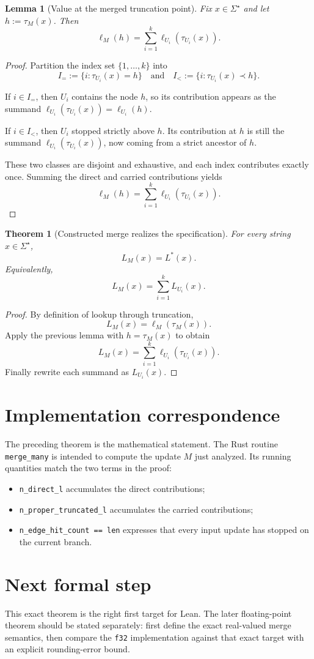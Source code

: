 \documentclass{article}
\newtheorem{lemma}{Lemma}
\newtheorem{theorem}{Theorem}
\begin{document}
\begin{lemma}[Value at the merged truncation point]
Fix $x \in \Sigma^\star$ and let $h := \tau_M(x)$.
Then
\[
\ell_M(h) = \sum_{i=1}^k \ell_{U_i}(\tau_{U_i}(x)).
\]
\end{lemma}

\begin{proof}
Partition the index set $\{1,\dots,k\}$ into
\[
I_{=}:=\{i : \tau_{U_i}(x)=h\}
\quad\text{and}\quad
I_{<}:=\{i : \tau_{U_i}(x)\prec h\}.
\]

If $i \in I_{=}$, then $U_i$ contains the node $h$, so its contribution appears
as the summand $\ell_{U_i}(\tau_{U_i}(x)) = \ell_{U_i}(h)$.

If $i \in I_{<}$, then $U_i$ stopped strictly above $h$.
Its contribution at $h$ is still the summand
$\ell_{U_i}(\tau_{U_i}(x))$, now coming from a strict ancestor of $h$.

These two classes are disjoint and exhaustive, and each index contributes
exactly once.
Summing the direct and carried contributions yields
\[
\ell_M(h)=\sum_{i=1}^k \ell_{U_i}(\tau_{U_i}(x)).
\]
\end{proof}

\begin{theorem}[Constructed merge realizes the specification]
For every string $x \in \Sigma^\star$,
\[
L_M(x) = L^\ast(x).
\]
Equivalently,
\[
L_M(x) = \sum_{i=1}^k L_{U_i}(x).
\]
\end{theorem}

\begin{proof}
By definition of lookup through truncation,
\[
L_M(x) = \ell_M(\tau_M(x)).
\]
Apply the previous lemma with $h = \tau_M(x)$ to obtain
\[
L_M(x) = \sum_{i=1}^k \ell_{U_i}(\tau_{U_i}(x)).
\]
Finally rewrite each summand as $L_{U_i}(x)$.
\end{proof}

\section{Implementation correspondence}

The preceding theorem is the mathematical statement.
The Rust routine \texttt{merge\_many} is intended to compute the update $M$ just
analyzed.
Its running quantities match the two terms in the proof:
\begin{itemize}
\item \texttt{n\_direct\_l} accumulates the direct contributions;
\item \texttt{n\_proper\_truncated\_l} accumulates the carried contributions;
\item \texttt{n\_edge\_hit\_count == len} expresses that every input update has
stopped on the current branch.
\end{itemize}

\section{Next formal step}

This exact theorem is the right first target for Lean.
The later floating-point theorem should be stated separately: first define the
exact real-valued merge semantics, then compare the \texttt{f32} implementation
against that exact target with an explicit rounding-error bound.
\end{document}
